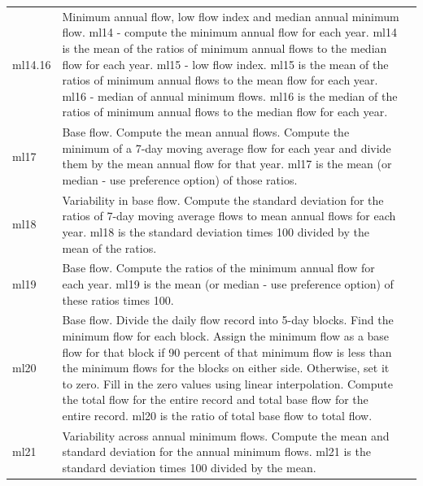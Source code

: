 \documentclass[a4paper,11pt]{article}\usepackage[]{graphicx}\usepackage[]{color}
\begin{document}
\begin{table}[ht]
\begin{threeparttable}[b]
\begin{tabularx}{\textwidth}{lXl}
  ml14.16 & Minimum annual flow, low flow index and median annual minimum flow. ml14 - compute the minimum annual flow for each year. ml14 is the mean of the ratios of minimum annual flows to the median flow for each year. ml15 - low flow index. ml15 is the mean of the ratios of minimum annual flows to the mean flow for each year. ml16 - median of annual minimum flows. ml16 is the median of the ratios of minimum annual flows to the median flow for each year. \\ 
  ml17 & Base flow. Compute the mean annual flows. Compute the minimum of a 7-day moving average flow for each year and divide them by the mean annual flow for that year. ml17 is the mean (or median - use preference option) of those ratios. \\
  ml18 & Variability in base flow. Compute the standard deviation for the ratios of 7-day moving average flows to mean annual flows for each year. ml18 is the standard deviation times 100 divided by the mean of the ratios. \\
  ml19 & Base flow. Compute the ratios of the minimum annual flow for each year. ml19 is the mean (or median - use preference option) of these ratios times 100. \\
  ml20 & Base flow. Divide the daily flow record into 5-day blocks. Find the minimum flow for each block. Assign the minimum flow as a base flow for that block if 90 percent of that minimum flow is less than the minimum flows for the blocks on either side. Otherwise, set it to zero. Fill in the zero values using linear interpolation. Compute the total flow for the entire record and total base flow for the entire record. ml20 is the ratio of total base flow to total flow. \\
  ml21 & Variability across annual minimum flows. Compute the mean and standard deviation for the annual minimum flows. ml21 is the standard deviation times 100 divided by the mean. \\
    \hline
  \end{tabularx}
  \end{threeparttable}
\end{table}
\end{document}
